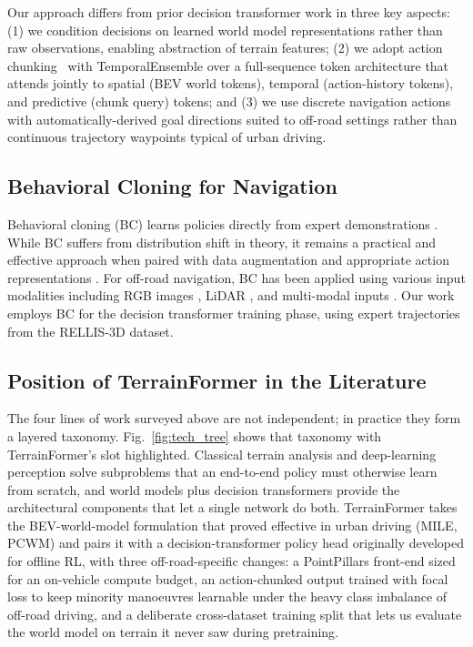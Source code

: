 \documentclass[sensors,article,submit,pdftex,moreauthors]{Definitions/mdpi}
\providecommand{\DIFadd}[1]{{\protect\color{red}#1}} %
\providecommand{\DIFaddbegin}{} %
\providecommand{\DIFaddincludegraphics}[2][]{{\color{blue}\fbox{\DIFOincludegraphics[#1]{#2}}}} %
\DeclareRobustCommand{\DIFaddbegin}{\DIFOaddbegin \let\includegraphics\DIFaddincludegraphics} %
\begin{document}
Our approach differs from prior decision transformer work in three key aspects: (1) we condition decisions on learned world model representations rather than raw observations, enabling abstraction of terrain features; (2) we adopt action chunking~\cite{zhao2023act} with TemporalEnsemble over a full-sequence token architecture that attends jointly to spatial (BEV world tokens), temporal (action-history tokens), and predictive (chunk query) tokens; and (3) we use discrete navigation actions with automatically-derived goal directions suited to off-road settings rather than continuous trajectory waypoints typical of urban driving.

\subsection{Behavioral Cloning for Navigation}

Behavioral cloning (BC) learns policies directly from expert demonstrations \cite{pomerleau1989, bojarski2016}. While BC suffers from distribution shift in theory, it remains a practical and effective approach when paired with data augmentation and appropriate action representations \cite{codevilla2018}. For off-road navigation, BC has been applied using various input modalities including RGB images \cite{kahn2021}, LiDAR \cite{wigness2019}, and multi-modal inputs \cite{triest2023}. Our work employs BC for the decision transformer training phase, using expert trajectories from the RELLIS-3D dataset.

\DIFaddbegin \subsection{\DIFadd{Position of TerrainFormer in the Literature}}
\label{sec:lit_position}

\DIFadd{The four lines of work surveyed above are not independent; in practice they form a layered taxonomy. Fig.~\ref{fig:tech_tree} shows that taxonomy with TerrainFormer's slot highlighted. Classical terrain analysis and deep-learning perception solve subproblems that an end-to-end policy must otherwise learn from scratch, and world models plus decision transformers provide the architectural components that let a single network do both. TerrainFormer takes the BEV-world-model formulation that proved effective in urban driving (MILE, PCWM) and pairs it with a decision-transformer policy head originally developed for offline RL, with three off-road-specific changes: a PointPillars front-end sized for an on-vehicle compute budget, an action-chunked output trained with focal loss to keep minority manoeuvres learnable under the heavy class imbalance of off-road driving, and a deliberate cross-dataset training split that lets us evaluate the world model on terrain it never saw during pretraining.
}
\end{document}
